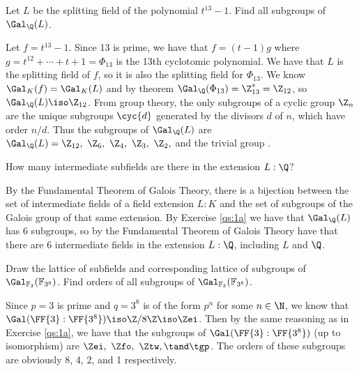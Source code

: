\documentclass{article}
\begin{document}
\setcounter{section}{9} %
\begin{subexercise} \label{qs:1a} %
Let \( L \) be the splitting field of the polynomial \( t^{13} - 1 \). Find all subgroups of \( \Gal_{\Q}(L) \).
\end{subexercise}
\begin{solution}
Let \( f=t^{13}-1 \).
Since 13 is prime, we have that \( f = (t-1)g \) where \( g = t^{12}+\cdots+t+1 = \Phi_{13} \) is the 13th cyclotomic polynomial.
We have that \( L \) is the splitting field of \( f \), so it is also the splitting field for \( \Phi_{13} \).
We know \( \Gal_K(f) = \Gal_K(L) \) and by theorem \( \Gal_\Q(\Phi_{13}) = \Z^*_{13} = \Z_{12} \), so \( \Gal_\Q(L) \iso \Z_{12} \).
From group theory, the only subgroups of a cyclic group \( \Z_n \) are the unique subgroups \( \cyc{d} \) generated by the divisors \( d \) of \( n \), which have order \( n/d \).
Thus the subgroups of \( \Gal_\Q(L) \) are \( \Gal_\Q(L) = \Z_{12},\ \Z_6,\ \Z_4,\ \Z_3,\ \Z_2, \) and the trivial group \tgp.
\end{solution}

\begin{subexercise} \label{qs:1b} %
How many intermediate subfields are there in the extension \( L : \Q \)?
\end{subexercise}
\begin{solution}
By the Fundamental Theorem of Galois Theory, there is a bijection between the set of intermediate fields of a field extension \( L:K \) and the set of subgroups of the Galois group of that same extension.
By Exercise \ref{qs:1a} we have that \( \Gal_{\Q}(L) \) has 6 subgroups, so by the Fundamental Theorem of Galois Theory have that there are 6 intermediate fields in the extension \( L:\Q \), including \( L \) and \( \Q \).
\end{solution}

\begin{exercise} \label{qs:2} %
Draw the lattice of subfields and corresponding lattice of subgroups of \( \Gal_{\mathbb{F}_3}(\mathbb{F}_{3^8}) \). Find orders of all subgroups of \( \Gal_{\mathbb{F}_3}(\mathbb{F}_{3^8}) \).
\end{exercise}
\begin{solution}
Since \( p=3 \) is prime and \( q=3^8 \) is of the form \( p^n \) for some \( n\in \N \), we know that \( \Gal(\FF{3} : \FF{3^8}) \iso \Z/8\Z \iso \Zei \).
Then by the same reasoning as in Exercise \ref{qs:1a}, we have that the subgroups of \( \Gal(\FF{3} : \FF{3^8}) \) (up to isomorphism) are \( \Zei,\ \Zfo,\ \Ztw, \tand \tgp \).
The orders of these subgroups are obviously 8, 4, 2, and 1 respectively.
\end{solution}
\end{document}
